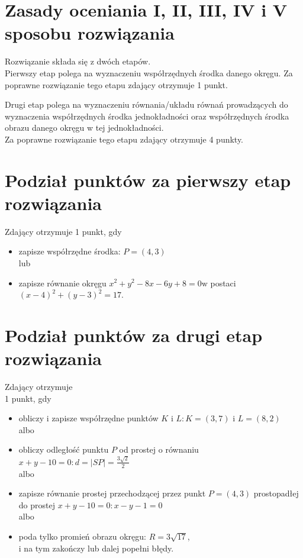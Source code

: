 \documentclass[10pt]{article}
\begin{document}
\section*{Zasady oceniania I, II, III, IV i V sposobu rozwiązania}
Rozwiązanie składa się z dwóch etapów.\\
Pierwszy etap polega na wyznaczeniu współrzędnych środka danego okręgu. Za poprawne rozwiązanie tego etapu zdający otrzymuje 1 punkt.

Drugi etap polega na wyznaczeniu równania/układu równań prowadzących do wyznaczenia współrzędnych środka jednokładności oraz współrzędnych środka obrazu danego okręgu w tej jednokładności.\\
Za poprawne rozwiązanie tego etapu zdający otrzymuje 4 punkty.

\section*{Podział punktów za pierwszy etap rozwiązania}
Zdający otrzymuje 1 punkt, gdy

\begin{itemize}
  \item zapisze współrzędne środka: $P=(4,3)$\\
lub
  \item zapisze równanie okręgu $x^{2}+y^{2}-8 x-6 y+8=0 \mathrm{w}$ postaci $(x-4)^{2}+(y-3)^{2}=17$.
\end{itemize}

\section*{Podział punktów za drugi etap rozwiązania}
Zdający otrzymuje\\
1 punkt, gdy

\begin{itemize}
  \item obliczy i zapisze współrzędne punktów $K$ i $L: K=(3,7)$ i $L=(8,2)$\\
albo
  \item obliczy odległość punktu $P$ od prostej o równaniu $x+y-10=0: d=|S P|=\frac{3 \sqrt{2}}{2}$\\
albo
  \item zapisze równanie prostej przechodzącej przez punkt $P=(4,3)$ prostopadłej do prostej $x+y-10=0: x-y-1=0$\\
albo
  \item poda tylko promień obrazu okręgu: $R=3 \sqrt{17}$,\\
i na tym zakończy lub dalej popełni błędy.
\end{itemize}
\end{document}
